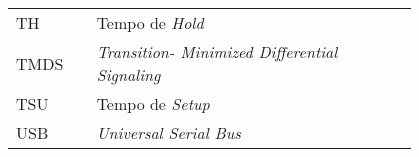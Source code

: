 \begin{flushleft}
\begin{longtable}{l p{0.8\linewidth}}
T{\tiny H}        & Tempo de \textit{Hold }                                                                                          \\
TMDS      & \textit{Transition- Minimized Differential Signaling}                                                 \\
T{\tiny SU}      & Tempo de \textit{Setup }                                                                                         \\
USB       & \textit{Universal Serial Bus }                                             					
\end{longtable}
\end{flushleft}

